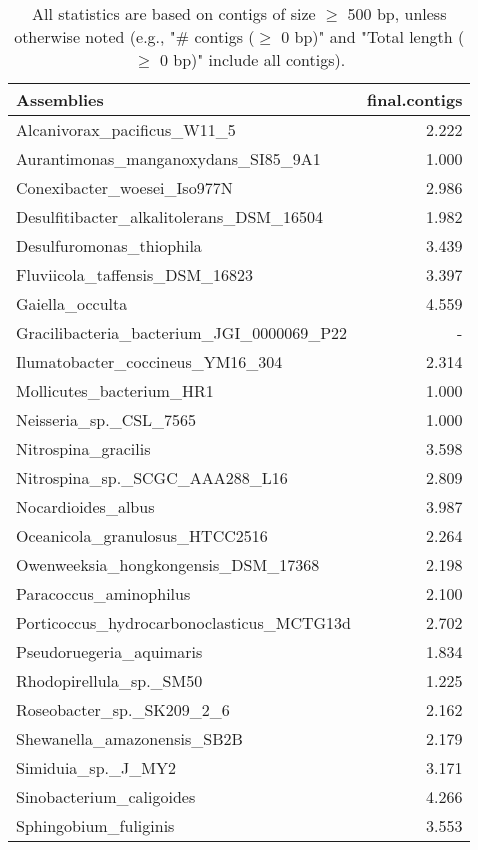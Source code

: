 \documentclass[12pt,a4paper]{article}
\begin{document}
\begin{table}[ht]
\begin{center}
\caption{All statistics are based on contigs of size $\geq$ 500 bp, unless otherwise noted (e.g., "\# contigs ($\geq$ 0 bp)" and "Total length ($\geq$ 0 bp)" include all contigs).}
\begin{tabular}{|l*{1}{|r}|}
\hline
Assemblies & final.contigs \\ \hline
Alcanivorax\_pacificus\_W11\_5 & 2.222 \\ \hline
Aurantimonas\_manganoxydans\_SI85\_9A1 & 1.000 \\ \hline
Conexibacter\_woesei\_Iso977N & 2.986 \\ \hline
Desulfitibacter\_alkalitolerans\_DSM\_16504 & 1.982 \\ \hline
Desulfuromonas\_thiophila & 3.439 \\ \hline
Fluviicola\_taffensis\_DSM\_16823 & 3.397 \\ \hline
Gaiella\_occulta & 4.559 \\ \hline
Gracilibacteria\_bacterium\_JGI\_0000069\_P22 & - \\ \hline
Ilumatobacter\_coccineus\_YM16\_304 & 2.314 \\ \hline
Mollicutes\_bacterium\_HR1 & 1.000 \\ \hline
Neisseria\_sp.\_CSL\_7565 & 1.000 \\ \hline
Nitrospina\_gracilis & 3.598 \\ \hline
Nitrospina\_sp.\_SCGC\_AAA288\_L16 & 2.809 \\ \hline
Nocardioides\_albus & 3.987 \\ \hline
Oceanicola\_granulosus\_HTCC2516 & 2.264 \\ \hline
Owenweeksia\_hongkongensis\_DSM\_17368 & 2.198 \\ \hline
Paracoccus\_aminophilus & 2.100 \\ \hline
Porticoccus\_hydrocarbonoclasticus\_MCTG13d & 2.702 \\ \hline
Pseudoruegeria\_aquimaris & 1.834 \\ \hline
Rhodopirellula\_sp.\_SM50 & 1.225 \\ \hline
Roseobacter\_sp.\_SK209\_2\_6 & 2.162 \\ \hline
Shewanella\_amazonensis\_SB2B & 2.179 \\ \hline
Simiduia\_sp.\_J\_MY2 & 3.171 \\ \hline
Sinobacterium\_caligoides & 4.266 \\ \hline
Sphingobium\_fuliginis & 3.553 \\ \hline

\end{tabular}
\end{center}
\end{table}
\end{document}
